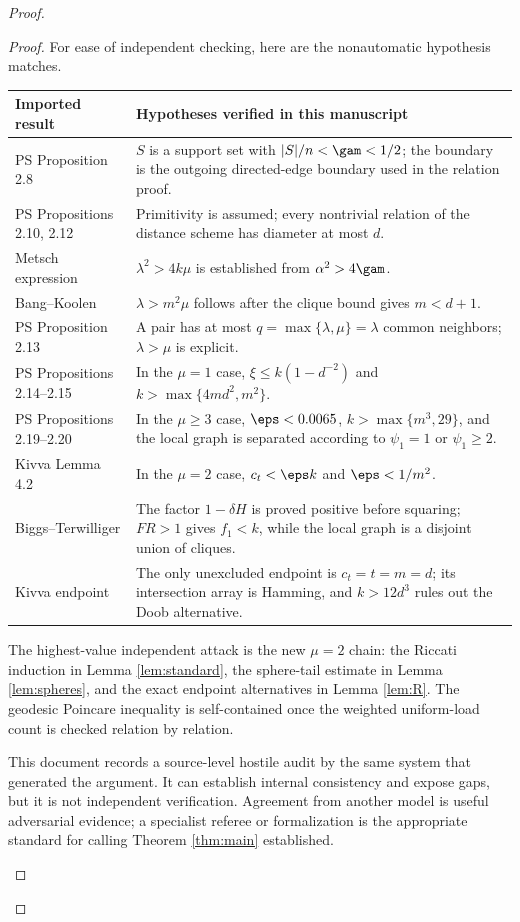 \begin{proof}
\begin{proof}
For ease of independent checking, here are the nonautomatic hypothesis matches.
\begin{center}
\small
\begin{tabular}{@{}p{}p{}@{}}
\toprule
Imported result & Hypotheses verified in this manuscript \\
\midrule
PS Proposition 2.8 & $S$ is a support set with $|S|/n<\gam<1/2$; the boundary is the outgoing directed-edge boundary used in the relation proof. \\
PS Propositions 2.10, 2.12 & Primitivity is assumed; every nontrivial relation of the distance scheme has diameter at most $d$. \\
Metsch expression & $\lambda^2>4k\mu$ is established from $\alpha^2>4\gam$. \\
Bang--Koolen & $\lambda>m^2\mu$ follows after the clique bound gives $m<d+1$. \\
PS Proposition 2.13 & A pair has at most $q=\max\{\lambda,\mu\}=\lambda$ common neighbors; $\lambda>\mu$ is explicit. \\
PS Propositions 2.14--2.15 & In the $\mu=1$ case, $\xi\le k(1-d^{-2})$ and $k>\max\{4md^2,m^2\}$. \\
PS Propositions 2.19--2.20 & In the $\mu\ge3$ case, $\eps<0.0065$, $k>\max\{m^3,29\}$, and the local graph is separated according to $\psi_1=1$ or $\psi_1\ge2$. \\
Kivva Lemma 4.2 & In the $\mu=2$ case, $c_t<\eps k$ and $\eps<1/m^2$. \\
Biggs--Terwilliger & The factor $1-\delta H$ is proved positive before squaring; $FR>1$ gives $f_1<k$, while the local graph is a disjoint union of cliques. \\
Kivva endpoint & The only unexcluded endpoint is $c_t=t=m=d$; its intersection array is Hamming, and $k>12d^3$ rules out the Doob alternative. \\
\bottomrule
\end{tabular}
\end{center}

The highest-value independent attack is the new $\mu=2$ chain: the Riccati induction in Lemma \ref{lem:standard}, the sphere-tail estimate in Lemma \ref{lem:spheres}, and the exact endpoint alternatives in Lemma \ref{lem:R}.  The geodesic Poincare inequality is self-contained once the weighted uniform-load count is checked relation by relation.

\begin{remark}
This document records a source-level hostile audit by the same system that generated the argument.  It can establish internal consistency and expose gaps, but it is not independent verification.  Agreement from another model is useful adversarial evidence; a specialist referee or formalization is the appropriate standard for calling Theorem \ref{thm:main} established.
\end{remark}


\end{proof}
\end{proof}
